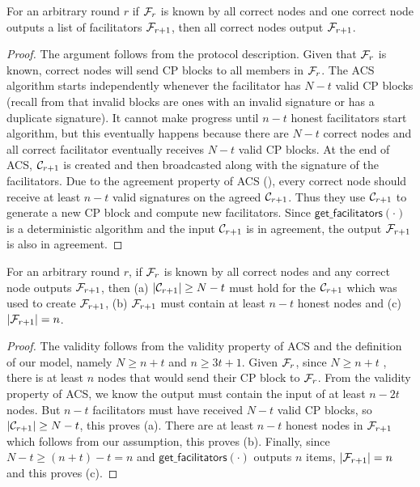 \begin{lemma}
\label{lemma:agreement}
For an arbitrary round $r$
if $\mathcal{F}_{r}$ is known by all correct nodes and one correct node outputs a list of facilitators $\mathcal{F}_{r+1}$,
then all correct nodes output $\mathcal{F}_{r+1}$.
\end{lemma}
\begin{proof}
The argument follows from the protocol description.
Given that $\mathcal{F}_r$ is known,
correct nodes will send CP blocks to all members in $\mathcal{F}_r$.
The ACS algorithm starts independently whenever the facilitator has $N - t$ valid CP blocks
(recall from  that invalid blocks are ones with an invalid signature or has a duplicate signature).
It cannot make progress until $n-t$ honest facilitators start algorithm,
but this eventually happens because there are $N - t$ correct nodes and all correct facilitator eventually receives $N -t$ valid CP blocks.
At the end of ACS, $\mathcal{C}_{r+1}$ is created and then broadcasted along with the signature of the facilitators.
Due to the agreement property of ACS (),
every correct node should receive at least $n - t$ valid signatures on the agreed $\mathcal{C}_{r+1}$.
Thus they use $\mathcal{C}_{r+1}$ to generate a new CP block and compute new facilitators.
Since $\textsf{get\_facilitators}(\cdot)$ is a deterministic algorithm and the input $\mathcal{C}_{r+1}$ is in agreement, the output $\mathcal{F}_{r+1}$ is also in agreement.
\end{proof}

\begin{lemma}
\label{lemma:validity}
For an arbitrary round $r$,
if $\mathcal{F}_r$ is known by all correct nodes and any correct node outputs $\mathcal{F}_{r+1}$,
then (a) $|\mathcal{C}_{r+1}| \ge N - t$ must hold for the $\mathcal{C}_{r+1}$ which was used to create $\mathcal{F}_{r+1}$,
(b) $\mathcal{F}_{r+1}$ must contain at least $n - t$ honest nodes and
(c) $|\mathcal{F}_{r+1}| = n$.
\end{lemma}
\begin{proof}
The validity follows from the validity property of ACS and the definition of our model,
namely $N \ge n + t$ and $n \ge 3t + 1$.
Given $\mathcal{F}_r$, since $N \ge n + t$ , there is at least $n$ nodes that would send their CP block to $\mathcal{F}_r$.
From the validity property of ACS, we know the output must contain the input of at least $n - 2t$ nodes.
But $n -t$ facilitators must have received $N - t$ valid CP blocks, so $|\mathcal{C}_{r+1}| \ge N-t$, this proves (a).
There are at least $n-t$ honest nodes in $\mathcal{F}_{r+1}$ which follows from our assumption, this proves (b).
Finally, since $N-t \ge (n+t) -t = n$ and $\textsf{get\_facilitators}(\cdot)$ outputs $n$ items, $|\mathcal{F}_{r+1}| = n$ and this proves (c).
\end{proof}

